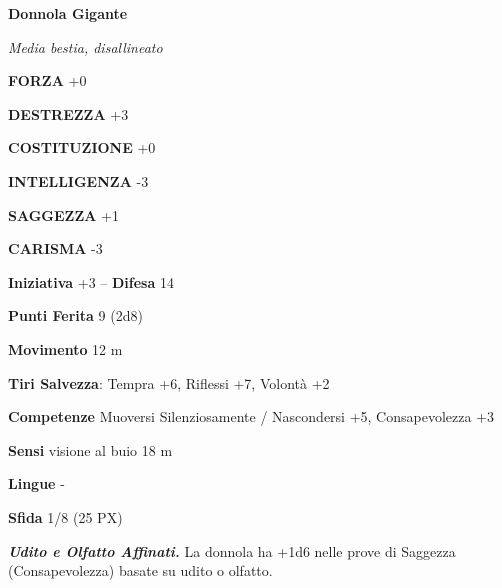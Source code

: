 \begin{multicols}{2}















	\medskip\textbf{Donnola Gigante}

	\textit{Media bestia, disallineato}

	\textbf{FORZA} +0

	\textbf{DESTREZZA} +3

	\textbf{COSTITUZIONE} +0

	\textbf{INTELLIGENZA} -3

	\textbf{SAGGEZZA} +1

	\textbf{CARISMA} -3

	\textbf{Iniziativa} +3 -- \textbf{Difesa} 14

	\textbf{Punti Ferita} 9 (2d8)

	\textbf{Movimento} 12 m

	\textbf{Tiri Salvezza}: Tempra +6, Riflessi +7, Volontà +2

	\textbf{Competenze} Muoversi Silenziosamente / Nascondersi +5, Consapevolezza +3

	\textbf{Sensi} visione al buio 18 m

	\textbf{Lingue} -

	\textbf{Sfida} 1/8 (25 PX)

	\textit{\textbf{Udito e Olfatto Affinati.}} La donnola ha +1d6 nelle prove di Saggezza (Consapevolezza) basate su udito o olfatto.


\end{multicols}
